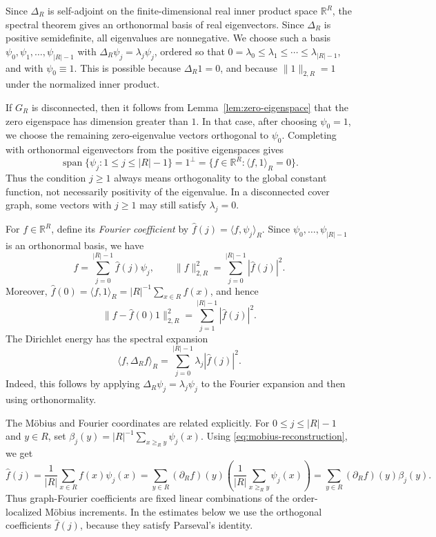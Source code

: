 \documentclass[twoside,12pt]{article}
\begin{document}
Since \(\Delta_R\) is self-adjoint on the finite-dimensional real inner
product space \(\mathbb R^R\), the spectral theorem gives an orthonormal
basis of real eigenvectors. Since \(\Delta_R\) is positive semidefinite,
all eigenvalues are nonnegative. We choose such a basis
\(\psi_0,\psi_1,\ldots,\psi_{|R|-1}\) with
\(\Delta_R\psi_j=\lambda_j\psi_j\), ordered so that
\(0=\lambda_0\le\lambda_1\le\cdots\le\lambda_{|R|-1}\), and with
\(\psi_0\equiv1\). This is possible because \(\Delta_R1=0\), and because
\(\|1\|_{2,R}=1\) under the normalized inner product.

If \(G_R\) is disconnected, then it follows from Lemma~\ref{lem:zero-eigenspace} that the
zero eigenspace has dimension greater than \(1\). In that case, after
choosing \(\psi_0=1\), we choose the remaining zero-eigenvalue vectors
orthogonal to \(\psi_0\). Completing with orthonormal eigenvectors from
the positive eigenspaces gives
\[
 \operatorname{span}\{\psi_j:1\le j\le |R|-1\}
 =
 1^\perp
 =
 \{f\in\mathbb R^R:\langle f,1\rangle_R=0\}.
\]
Thus the condition \(j\ge1\) always means orthogonality to the global
constant function, not necessarily positivity of the eigenvalue. In a
disconnected cover graph, some vectors with \(j\ge1\) may still satisfy
\(\lambda_j=0\).

For \(f\in\mathbb R^R\), define its \textit{Fourier coefficient} by
\(\widehat f(j)=\langle f,\psi_j\rangle_R\). Since
\(\psi_0,\ldots,\psi_{|R|-1}\) is an orthonormal basis, we have
\begin{equation}\label{eq:fourier-parseval}
 f=\sum_{j=0}^{|R|-1}\widehat f(j)\psi_j,
 \qquad
 \|f\|_{2,R}^2=\sum_{j=0}^{|R|-1}|\widehat f(j)|^2.
\end{equation}
Moreover, \(\widehat f(0)=\langle f,1\rangle_R=|R|^{-1}\sum_{x\in R}f(x)\),
and hence
 $$\bigl\|f-\widehat f(0)1\bigr\|_{2,R}^2
 =
\sum_{j=1}^{|R|-1}|\widehat f(j)|^2.$$
The Dirichlet energy has the spectral expansion
$$
 \langle f,\Delta_Rf\rangle_R
 =
\sum_{j=0}^{|R|-1}\lambda_j|\widehat f(j)|^2.
$$
Indeed, this follows by applying \(\Delta_R\psi_j=\lambda_j\psi_j\) to
the Fourier expansion and then using orthonormality.

The M\"obius and Fourier coordinates are related explicitly. For
\(0\le j\le |R|-1\) and \(y\in R\), set
\(\beta_j(y)=|R|^{-1}\sum_{x\ge_R y}\psi_j(x)\). Using
\eqref{eq:mobius-reconstruction}, we get
\[
 \widehat f(j)
 =
 \frac1{|R|}\sum_{x\in R}f(x)\psi_j(x)
 =
 \sum_{y\in R}(\partial_Rf)(y)
 \left(\frac1{|R|}\sum_{x\ge_R y}\psi_j(x)\right)
 =
 \sum_{y\in R}(\partial_Rf)(y)\beta_j(y).
\]
Thus graph-Fourier coefficients are fixed linear combinations of the
order-localized M\"obius increments. In the estimates below we use the
orthogonal coefficients \(\widehat f(j)\), because they satisfy Parseval's
identity.
\end{document}
